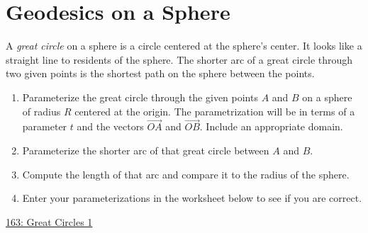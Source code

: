 \documentclass{ximera}
\begin{document}
\section{Geodesics on a Sphere}

\begin{question}  \label{Q9df7udsftr}
A \emph{great circle} on a sphere is a circle centered at the sphere's center. It looks like a straight line to residents of the sphere. The shorter arc of a great circle through two given points is the shortest path on the sphere between the points.

\begin{enumerate}
\item{Parameterize the great circle through the given points $A$ and $B$ on a sphere of radius $R$ centered at the origin. The parametrization will be in terms of a parameter $t$ and the vectors $\overrightarrow{OA}$ and $\overrightarrow{OB}$. Include an appropriate domain.}

\item{Parameterize the shorter arc of that great circle between $A$ and $B$.}
\item{Compute the length of that arc and compare it to the radius of the sphere.}
\item{Enter your parameterizations in the worksheet below to see if you are correct.}

\end{enumerate}

\begin{onlineOnly}
    \begin{center}
\end{center}
\end{onlineOnly}

\href{https://www.desmos.com/3d/vulzde8gww}{163: Great Circles 1}

\end{question}
\end{document}
